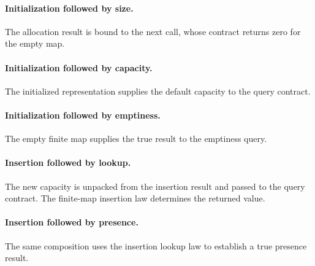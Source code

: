 \documentclass[11pt]{article}
\begin{document}


\paragraph{Initialization followed by size.} The allocation result is bound to the next call, whose contract returns zero for the empty map.



\paragraph{Initialization followed by capacity.} The initialized representation supplies the default capacity to the query contract.



\paragraph{Initialization followed by emptiness.} The empty finite map supplies the true result to the emptiness query.



\paragraph{Insertion followed by lookup.} The new capacity is unpacked from the insertion result and passed to the query contract. The finite-map insertion law determines the returned value.



\paragraph{Insertion followed by presence.} The same composition uses the insertion lookup law to establish a true presence result.






\end{document}
